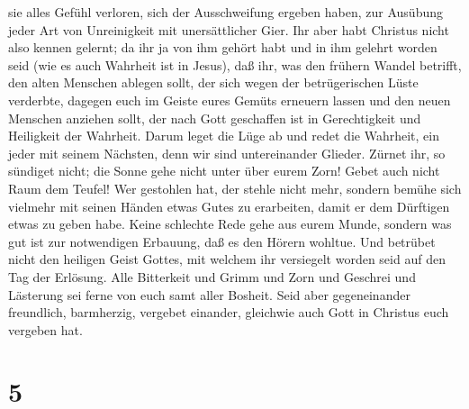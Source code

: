 sie alles Gefühl verloren, sich der Ausschweifung ergeben haben, zur
Ausübung jeder Art von Unreinigkeit mit unersättlicher Gier.
 Ihr aber habt Christus nicht also kennen gelernt;
 da ihr ja von ihm gehört habt und in ihm gelehrt worden
seid (wie es auch Wahrheit ist in Jesus),  daß ihr, was
den frühern Wandel betrifft, den alten Menschen ablegen sollt, der sich
wegen der betrügerischen Lüste verderbte,  dagegen euch
im Geiste eures Gemüts erneuern lassen  und den neuen
Menschen anziehen sollt, der nach Gott geschaffen ist in Gerechtigkeit
und Heiligkeit der Wahrheit.  Darum leget die Lüge ab und
redet die Wahrheit, ein jeder mit seinem Nächsten, denn wir sind
untereinander Glieder.  Zürnet ihr, so sündiget nicht;
die Sonne gehe nicht unter über eurem Zorn!  Gebet auch
nicht Raum dem Teufel!  Wer gestohlen hat, der stehle
nicht mehr, sondern bemühe sich vielmehr mit seinen Händen etwas Gutes
zu erarbeiten, damit er dem Dürftigen etwas zu geben habe.
 Keine schlechte Rede gehe aus eurem Munde, sondern was
gut ist zur notwendigen Erbauung, daß es den Hörern wohltue.
 Und betrübet nicht den heiligen Geist Gottes, mit
welchem ihr versiegelt worden seid auf den Tag der Erlösung.
 Alle Bitterkeit und Grimm und Zorn und Geschrei und
Lästerung sei ferne von euch samt aller Bosheit.  Seid
aber gegeneinander freundlich, barmherzig, vergebet einander, gleichwie
auch Gott in Christus euch vergeben hat.

\hypertarget{section-4}{%
\section{5}\label{section-4}}

